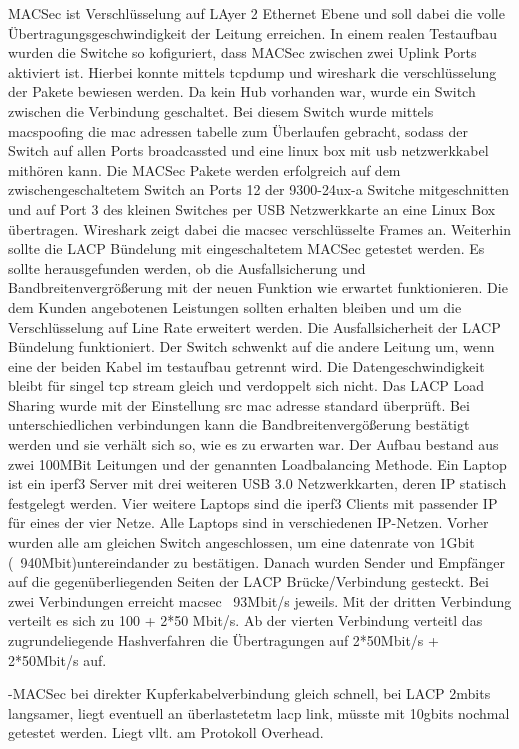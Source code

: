 \documentclass[english,runningheads,a4paper]{llncs}[2018/03/10]
\begin{document}
MACSec ist Verschlüsselung auf LAyer 2 Ethernet Ebene und soll dabei die volle Übertragungsgeschwindigkeit der Leitung erreichen. In einem realen Testaufbau wurden die Switche so kofiguriert, dass MACSec zwischen zwei Uplink Ports aktiviert ist. Hierbei konnte mittels tcpdump und wireshark die verschlüsselung der Pakete bewiesen werden. Da kein Hub vorhanden war, wurde ein Switch zwischen die Verbindung geschaltet. Bei diesem Switch wurde mittels macspoofing die mac adressen tabelle zum Überlaufen gebracht, sodass der Switch auf allen Ports broadcassted und eine linux box mit usb netzwerkkabel mithören kann. Die MACSec Pakete werden erfolgreich auf dem zwischengeschaltetem Switch an Ports 12 der 9300-24ux-a Switche mitgeschnitten und auf Port 3 des kleinen Switches per USB Netzwerkkarte an eine Linux Box übertragen. Wireshark zeigt dabei die macsec verschlüsselte Frames an.
Weiterhin sollte die LACP Bündelung mit eingeschaltetem MACSec getestet werden. Es sollte herausgefunden werden, ob die Ausfallsicherung und Bandbreitenvergrößerung mit der neuen Funktion wie erwartet funktionieren. Die dem Kunden angebotenen Leistungen sollten erhalten bleiben und um die Verschlüsselung auf Line Rate erweitert werden. Die Ausfallsicherheit der LACP Bündelung funktioniert. Der Switch schwenkt auf die andere Leitung um, wenn eine der beiden Kabel im testaufbau getrennt wird. Die Datengeschwindigkeit bleibt für singel tcp stream gleich und verdoppelt sich nicht. Das LACP Load Sharing wurde mit der Einstellung src mac adresse standard überprüft. Bei unterschiedlichen verbindungen kann die Bandbreitenvergößerung bestätigt werden und sie verhält sich so, wie es zu erwarten war. Der Aufbau bestand aus zwei 100MBit Leitungen und der genannten Loadbalancing Methode. Ein Laptop ist ein iperf3 Server mit drei weiteren USB 3.0 Netzwerkkarten, deren IP statisch festgelegt werden. Vier weitere Laptops sind die iperf3 Clients mit passender IP für eines der vier Netze. Alle  Laptops sind in verschiedenen IP-Netzen. Vorher wurden  alle am gleichen Switch angeschlossen, um eine datenrate von 1Gbit (~940Mbit)untereindander zu bestätigen. Danach wurden Sender und Empfänger auf die gegenüberliegenden Seiten der LACP Brücke/Verbindung gesteckt. Bei zwei Verbindungen erreicht macsec ~93Mbit/s jeweils. Mit der dritten Verbindung verteilt es sich zu 100 + 2*50 Mbit/s. Ab der vierten Verbindung verteitl das zugrundeliegende Hashverfahren die Übertragungen auf 2*50Mbit/s + 2*50Mbit/s auf.

-MACSec bei direkter Kupferkabelverbindung gleich schnell, bei LACP 2mbits langsamer, liegt eventuell an überlastetetm lacp link, müsste mit 10gbits nochmal getestet werden. Liegt vllt. am Protokoll Overhead.
\end{document}
